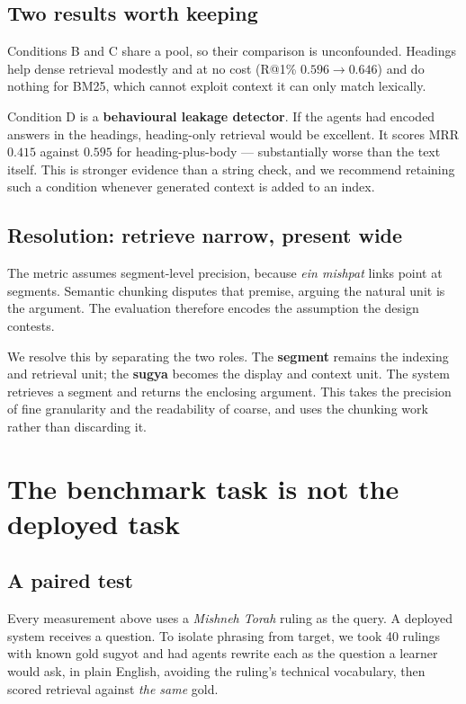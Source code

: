 \documentclass[11pt,a4paper]{article}
\begin{document}
\subsection{Two results worth keeping}

Conditions B and C share a pool, so their comparison is unconfounded. Headings
help dense retrieval modestly and at no cost (R@1\% $0.596 \to 0.646$) and do
nothing for BM25, which cannot exploit context it can only match lexically.

Condition D is a \textbf{behavioural leakage detector}. If the agents had encoded
answers in the headings, heading-only retrieval would be excellent. It scores
MRR $0.415$ against $0.595$ for heading-plus-body --- substantially worse than
the text itself. This is stronger evidence than a string check, and we recommend
retaining such a condition whenever generated context is added to an index.

\subsection{Resolution: retrieve narrow, present wide}

The metric assumes segment-level precision, because \emph{ein mishpat} links
point at segments. Semantic chunking disputes that premise, arguing the natural
unit is the argument. The evaluation therefore encodes the assumption the design
contests.

We resolve this by separating the two roles. The \textbf{segment} remains the
indexing and retrieval unit; the \textbf{sugya} becomes the display and context
unit. The system retrieves a segment and returns the enclosing argument. This
takes the precision of fine granularity and the readability of coarse, and uses
the chunking work rather than discarding it.

\section{The benchmark task is not the deployed task}\label{sec:questions}

\subsection{A paired test}

Every measurement above uses a \emph{Mishneh Torah} ruling as the query. A
deployed system receives a question. To isolate phrasing from target, we took 40
rulings with known gold sugyot and had agents rewrite each as the question a
learner would ask, in plain English, avoiding the ruling's technical vocabulary,
then scored retrieval against \emph{the same} gold.
\end{document}
